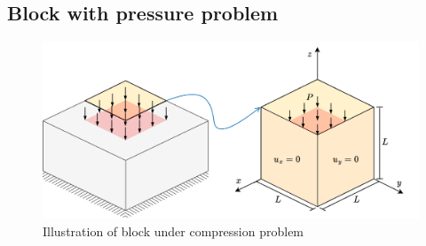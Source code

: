 \subsection{Block with pressure problem}

\begin{figure}[H]
\centering
\includegraphics[width=\textwidth]{png/block.png}
\caption{Illustration of block under compression problem}\label{fg:block_model}
\end{figure}

